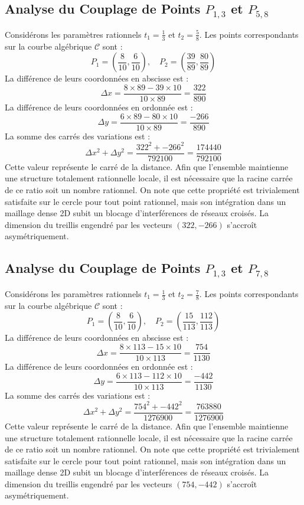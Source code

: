 \documentclass[12pt, a4paper]{article}
\begin{document}
\subsection{Analyse du Couplage de Points $P_{1,3}$ et $P_{5,8}$}
Considérons les paramètres rationnels $t_1 = \frac{1}{3}$ et $t_2 = \frac{5}{8}$.
Les points correspondants sur la courbe algébrique $\mathcal{C}$ sont :
$$ P_1 = \left( \frac{8}{10}, \frac{6}{10} \right), \quad P_2 = \left( \frac{39}{89}, \frac{80}{89} \right) $$
La différence de leurs coordonnées en abscisse est :
$$ \Delta x = \frac{8 \times 89 - 39 \times 10}{10 \times 89} = \frac{322}{890} $$
La différence de leurs coordonnées en ordonnée est :
$$ \Delta y = \frac{6 \times 89 - 80 \times 10}{10 \times 89} = \frac{-266}{890} $$
La somme des carrés des variations est :
$$ \Delta x^2 + \Delta y^2 = \frac{ 322^2 + -266^2 }{ 792100 } = \frac{ 174440 }{ 792100 } $$
Cette valeur représente le carré de la distance. Afin que l'ensemble maintienne une structure totalement rationnelle locale, il est nécessaire que la racine carrée de ce ratio soit un nombre rationnel. On note que cette propriété est trivialement satisfaite sur le cercle pour tout point rationnel, mais son intégration dans un maillage dense 2D subit un blocage d'interférences de réseaux croisés. La dimension du treillis engendré par les vecteurs $( 322, -266 )$ s'accroît asymétriquement.


\subsection{Analyse du Couplage de Points $P_{1,3}$ et $P_{7,8}$}
Considérons les paramètres rationnels $t_1 = \frac{1}{3}$ et $t_2 = \frac{7}{8}$.
Les points correspondants sur la courbe algébrique $\mathcal{C}$ sont :
$$ P_1 = \left( \frac{8}{10}, \frac{6}{10} \right), \quad P_2 = \left( \frac{15}{113}, \frac{112}{113} \right) $$
La différence de leurs coordonnées en abscisse est :
$$ \Delta x = \frac{8 \times 113 - 15 \times 10}{10 \times 113} = \frac{754}{1130} $$
La différence de leurs coordonnées en ordonnée est :
$$ \Delta y = \frac{6 \times 113 - 112 \times 10}{10 \times 113} = \frac{-442}{1130} $$
La somme des carrés des variations est :
$$ \Delta x^2 + \Delta y^2 = \frac{ 754^2 + -442^2 }{ 1276900 } = \frac{ 763880 }{ 1276900 } $$
Cette valeur représente le carré de la distance. Afin que l'ensemble maintienne une structure totalement rationnelle locale, il est nécessaire que la racine carrée de ce ratio soit un nombre rationnel. On note que cette propriété est trivialement satisfaite sur le cercle pour tout point rationnel, mais son intégration dans un maillage dense 2D subit un blocage d'interférences de réseaux croisés. La dimension du treillis engendré par les vecteurs $( 754, -442 )$ s'accroît asymétriquement.
\end{document}
